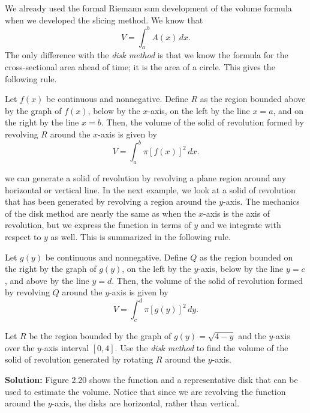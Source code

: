 \documentclass{report}
\begin{document}
    \pagebreak \bigbreak \noindent 
    We already used the formal Riemann sum development of the volume formula when we developed the slicing method. We know that
    \[
    V = \int_{a}^{b} A(x) \, dx.
    \]
    The only difference with the \textit{disk method} is that we know the formula for the cross-sectional area ahead of time; it is the area of a circle. This gives the following rule.
    \bigbreak \noindent 
    \begin{thrm}
       Let \( f(x) \) be continuous and nonnegative. Define \( R \) as the region bounded above by the graph of \( f(x) \), below by the \( x \)-axis, on the left by the line \( x = a \), and on the right by the line \( x = b \). Then, the volume of the solid of revolution formed by revolving \( R \) around the \( x \)-axis is given by
        \[
        V = \int_{a}^{b} \pi [f(x)]^2 \, dx.
        \] 
    \end{thrm}
    \bigbreak \noindent 
    we can generate a solid of revolution by revolving a plane region around any horizontal or vertical line. In the next example, we look at a solid of revolution that has been generated by revolving a region around the  $y$-axis.
  The mechanics of the disk method are nearly the same as when the  $x$-axis
  is the axis of revolution, but we express the function in terms of  $y$
  and we integrate with respect to $y$ as well. This is summarized in the following rule.
  \bigbreak \noindent 
  \begin{thrm}
    Let \( g(y) \) be continuous and nonnegative. Define \( Q \) as the region bounded on the right by the graph of \( g(y) \), on the left by the \( y \)-axis, below by the line \( y = c \), and above by the line \( y = d \). Then, the volume of the solid of revolution formed by revolving \( Q \) around the \( y \)-axis is given by
    \[
    V = \int_{c}^{d} \pi [g(y)]^2 \, dy.
    \]    
  \end{thrm}
  \bigbreak \noindent 
  \begin{eg}
      Let \( R \) be the region bounded by the graph of \( g(y) = \sqrt{4 - y} \) and the \( y \)-axis over the \( y \)-axis interval \([0, 4]\). Use the \textit{disk method} to find the volume of the solid of revolution generated by rotating \( R \) around the \( y \)-axis.
  \end{eg}
  \bigbreak \noindent 
  \textbf{Solution:} Figure 2.20 shows the function and a representative disk that can be used to estimate the volume. Notice that since we are revolving the function around the  $y$-axis, the disks are horizontal, rather than vertical.
\end{document}

